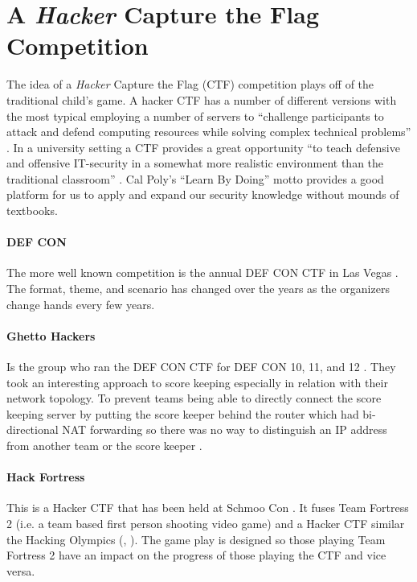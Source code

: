 \documentclass[10pt]{article}
\begin{document}
\section{A \textit{Hacker} Capture the Flag Competition}
The idea of a \textit{Hacker} Capture the Flag (CTF) competition plays off of
the traditional child's game. A hacker CTF has a number of different versions
with the most typical employing a number of servers to ``challenge participants
to attack and defend computing resources while solving complex technical
problems'' \cite{HackingCompetitionsForSecurityEducation}. In a university
setting a CTF provides a great opportunity ``to teach defensive and offensive
IT-security in a somewhat more realistic environment than the traditional
classroom'' \cite{HostingHackingChallenge}. Cal Poly's ``Learn By Doing'' motto
provides a good platform for us to apply and expand our security knowledge
without mounds of textbooks.

\paragraph*{DEF CON} The more well known competition is the annual DEF CON CTF
in Las Vegas \cite{DEFCONCTF}. The format, theme, and scenario has changed over
the years as the organizers change hands every few years.

\paragraph*{Ghetto Hackers} 
\label{GhettoHackers}
Is the group who ran the DEF CON CTF for DEF CON 10, 11, and 12
\cite{BlackHat2004}. They took an interesting approach to score keeping
especially in relation with their network topology. To prevent teams being able
to directly connect the score keeping server by putting the score keeper
behind the router which had bi-directional NAT forwarding so there was no way to
distinguish an IP address from another team or the score keeper
\cite{BlackHat2004}.

\paragraph*{Hack Fortress} This is a Hacker CTF that has been held at Schmoo Con 
\cite{HackFortress}. It fuses Team Fortress 2 (i.e. a team based first person shooting
video game) and a Hacker CTF similar the Hacking Olympics (\cite{Cipher}, \cite{SMPCTF}). 
The game play is designed so those playing Team Fortress 2 have an impact on the progress of
 those playing the CTF and vice versa.
\end{document}
